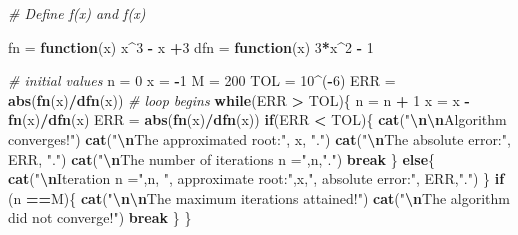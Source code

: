 \documentclass[
]{book}
\newenvironment{Shaded}{\begin{snugshade}}{\end{snugshade}}
\newcommand{\CommentTok}[1]{\textcolor[rgb]{0.56,0.35,0.01}{\textit{#1}}}
\newcommand{\ControlFlowTok}[1]{\textcolor[rgb]{0.13,0.29,0.53}{\textbf{#1}}}
\newcommand{\DecValTok}[1]{\textcolor[rgb]{0.00,0.00,0.81}{#1}}
\newcommand{\FunctionTok}[1]{\textcolor[rgb]{0.13,0.29,0.53}{\textbf{#1}}}
\newcommand{\NormalTok}[1]{#1}
\newcommand{\OtherTok}[1]{\textcolor[rgb]{0.56,0.35,0.01}{#1}}
\newcommand{\SpecialCharTok}[1]{\textcolor[rgb]{0.81,0.36,0.00}{\textbf{#1}}}
\newcommand{\StringTok}[1]{\textcolor[rgb]{0.31,0.60,0.02}{#1}}
\begin{document}
\begin{Shaded}
\begin{Highlighting}[]
\CommentTok{\# Define f(x) and f\textquotesingle{}(x)}

\NormalTok{fn }\OtherTok{=} \ControlFlowTok{function}\NormalTok{(x) x}\SpecialCharTok{\^{}}\DecValTok{3} \SpecialCharTok{{-}}\NormalTok{ x }\SpecialCharTok{+}\DecValTok{3}
\NormalTok{dfn }\OtherTok{=} \ControlFlowTok{function}\NormalTok{(x) }\DecValTok{3}\SpecialCharTok{*}\NormalTok{x}\SpecialCharTok{\^{}}\DecValTok{2} \SpecialCharTok{{-}} \DecValTok{1}

\CommentTok{\# initial values}
\NormalTok{n }\OtherTok{=} \DecValTok{0}
\NormalTok{x }\OtherTok{=} \SpecialCharTok{{-}}\DecValTok{1}
\NormalTok{M }\OtherTok{=} \DecValTok{200}
\NormalTok{TOL }\OtherTok{=} \DecValTok{10}\SpecialCharTok{\^{}}\NormalTok{(}\SpecialCharTok{{-}}\DecValTok{6}\NormalTok{)}
\NormalTok{ERR }\OtherTok{=} \FunctionTok{abs}\NormalTok{(}\FunctionTok{fn}\NormalTok{(x)}\SpecialCharTok{/}\FunctionTok{dfn}\NormalTok{(x))}
\CommentTok{\# loop begins}
\ControlFlowTok{while}\NormalTok{(ERR }\SpecialCharTok{\textgreater{}}\NormalTok{ TOL)\{}
\NormalTok{  n }\OtherTok{=}\NormalTok{ n }\SpecialCharTok{+} \DecValTok{1}
\NormalTok{  x }\OtherTok{=}\NormalTok{ x }\SpecialCharTok{{-}} \FunctionTok{fn}\NormalTok{(x)}\SpecialCharTok{/}\FunctionTok{dfn}\NormalTok{(x)}
\NormalTok{  ERR }\OtherTok{=} \FunctionTok{abs}\NormalTok{(}\FunctionTok{fn}\NormalTok{(x)}\SpecialCharTok{/}\FunctionTok{dfn}\NormalTok{(x))}
  \ControlFlowTok{if}\NormalTok{(ERR }\SpecialCharTok{\textless{}}\NormalTok{ TOL)\{}
     \FunctionTok{cat}\NormalTok{(}\StringTok{"}\SpecialCharTok{\textbackslash{}n\textbackslash{}n}\StringTok{Algorithm converges!"}\NormalTok{)}
     \FunctionTok{cat}\NormalTok{(}\StringTok{"}\SpecialCharTok{\textbackslash{}n}\StringTok{The approximated root:"}\NormalTok{, x, }\StringTok{"."}\NormalTok{)}
     \FunctionTok{cat}\NormalTok{(}\StringTok{"}\SpecialCharTok{\textbackslash{}n}\StringTok{The absolute error:"}\NormalTok{, ERR, }\StringTok{"."}\NormalTok{)}
     \FunctionTok{cat}\NormalTok{(}\StringTok{"}\SpecialCharTok{\textbackslash{}n}\StringTok{The number of iterations n ="}\NormalTok{,n,}\StringTok{"."}\NormalTok{)}
     \ControlFlowTok{break}
\NormalTok{    \} }\ControlFlowTok{else}\NormalTok{\{}
      \FunctionTok{cat}\NormalTok{(}\StringTok{"}\SpecialCharTok{\textbackslash{}n}\StringTok{Iteration n ="}\NormalTok{,n, }\StringTok{", approximate root:"}\NormalTok{,x,}\StringTok{", absolute error:"}\NormalTok{, ERR,}\StringTok{"."}\NormalTok{)}
\NormalTok{    \} }
    \ControlFlowTok{if}\NormalTok{ (n }\SpecialCharTok{==}\NormalTok{M)\{}
      \FunctionTok{cat}\NormalTok{(}\StringTok{"}\SpecialCharTok{\textbackslash{}n\textbackslash{}n}\StringTok{The maximum iterations attained!"}\NormalTok{)}
      \FunctionTok{cat}\NormalTok{(}\StringTok{"}\SpecialCharTok{\textbackslash{}n}\StringTok{The algorithm did not converge!"}\NormalTok{)}
      \ControlFlowTok{break}
\NormalTok{    \}}
\NormalTok{\}}
\end{Highlighting}
\end{Shaded}
\end{document}

